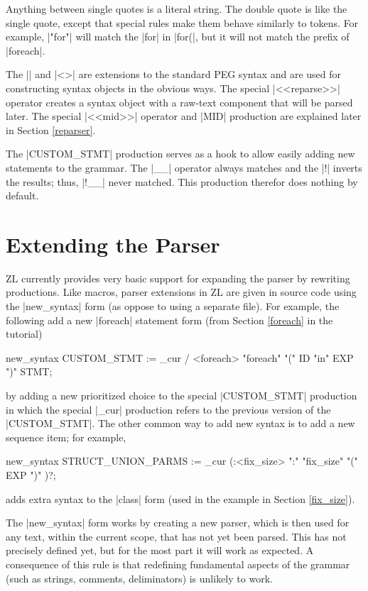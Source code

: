 Anything between single quotes is a literal string.  The double quote
is like the single quote, except that special rules make them behave
similarly to tokens.  For example, |"for"| will match the |for| in
|for(|, but it will not match the prefix of |foreach|.  

The |{}| and |<>| are extensions to the standard PEG syntax and are
used for constructing syntax objects in the obvious ways.  The special
|<<reparse>>| operator creates a syntax object with a raw-text
component that will be parsed later.  The special |<<mid>>| operator
and |MID| production are explained later in Section \ref{reparser}.

The |CUSTOM_STMT| production serves as a hook to allow easily adding
new statements to the grammar.  The |__| operator always matches and
the |!| inverts the results; thus, |!__| never matched.  This
production therefor does nothing by default.

\section{Extending the Parser}
\label{extending-parser}

ZL currently provides very basic support for expanding the parser by
rewriting productions.  Like macros, parser extensions in ZL are given
in source code using the |new_syntax| form (as oppose to using a
separate file).  For example, the following add a new |foreach|
statement form (from Section \ref{foreach} in the tutorial)
\begin{code}
new_syntax {
  CUSTOM_STMT := _cur / <foreach> "foreach" "(" {ID} "in" {EXP} ")" {STMT};
}
\end{code}
by adding a new prioritized choice to the special |CUSTOM_STMT|
production in which the special |_cur| production refers to the
previous version of the |CUSTOM_STMT|.  The other common way to add
new syntax is to add a new sequence item; for example,
\begin{code}
new_syntax {
  STRUCT_UNION_PARMS := _cur (:<fix_size> ":" "fix_size" "(" {EXP} ")" )?;
}
\end{code}
adds extra syntax to the |class| form (used in the example in Section
\ref{fix_size}).

The |new_syntax| form works by creating a new parser, which is then
used for any text, within the current scope, that has not yet been parsed.
This has not precisely defined yet, but for the most part it will work as
expected.  A consequence of this rule is that redefining fundamental
aspects of the grammar (such as strings, comments, deliminators) is
unlikely to work.


